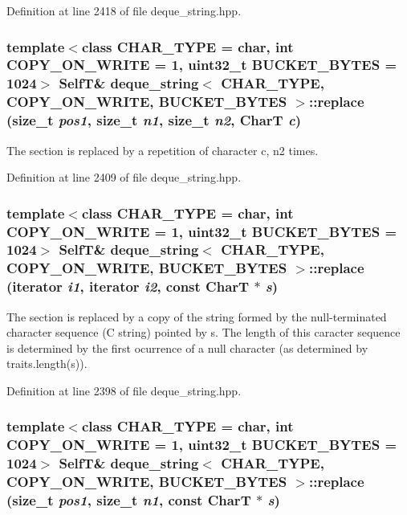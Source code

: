 Definition at line 2418 of file deque\_\-string.hpp.\hypertarget{classdeque__string_25e331d55a7113b19422c129816ff428}{
\subsubsection[{replace}]{\setlength{\rightskip}{0pt plus 5cm}template$<$class CHAR\_\-TYPE  = char, int COPY\_\-ON\_\-WRITE = 1, uint32\_\-t BUCKET\_\-BYTES = 1024$>$ {\bf SelfT}\& {\bf deque\_\-string}$<$ CHAR\_\-TYPE, COPY\_\-ON\_\-WRITE, BUCKET\_\-BYTES $>$::replace (size\_\-t {\em pos1}, \/  size\_\-t {\em n1}, \/  size\_\-t {\em n2}, \/  CharT {\em c})}}
\label{classdeque__string_25e331d55a7113b19422c129816ff428}


The section is replaced by a repetition of character c, n2 times. 

Definition at line 2409 of file deque\_\-string.hpp.\hypertarget{classdeque__string_4ce63da89c419a5a03d1661ac5328f0c}{
\subsubsection[{replace}]{\setlength{\rightskip}{0pt plus 5cm}template$<$class CHAR\_\-TYPE  = char, int COPY\_\-ON\_\-WRITE = 1, uint32\_\-t BUCKET\_\-BYTES = 1024$>$ {\bf SelfT}\& {\bf deque\_\-string}$<$ CHAR\_\-TYPE, COPY\_\-ON\_\-WRITE, BUCKET\_\-BYTES $>$::replace (iterator {\em i1}, \/  iterator {\em i2}, \/  const CharT $\ast$ {\em s})}}
\label{classdeque__string_4ce63da89c419a5a03d1661ac5328f0c}


The section is replaced by a copy of the string formed by the null-terminated character sequence (C string) pointed by s. The length of this caracter sequence is determined by the first ocurrence of a null character (as determined by traits.length(s)). 

Definition at line 2398 of file deque\_\-string.hpp.\hypertarget{classdeque__string_bd1b08c6f2c1c0c77d8a64a56ebe2a09}{
\subsubsection[{replace}]{\setlength{\rightskip}{0pt plus 5cm}template$<$class CHAR\_\-TYPE  = char, int COPY\_\-ON\_\-WRITE = 1, uint32\_\-t BUCKET\_\-BYTES = 1024$>$ {\bf SelfT}\& {\bf deque\_\-string}$<$ CHAR\_\-TYPE, COPY\_\-ON\_\-WRITE, BUCKET\_\-BYTES $>$::replace (size\_\-t {\em pos1}, \/  size\_\-t {\em n1}, \/  const CharT $\ast$ {\em s})}}
\label{classdeque__string_bd1b08c6f2c1c0c77d8a64a56ebe2a09}


